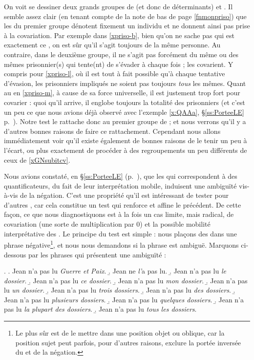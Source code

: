 On voit se dessiner deux grands groupes de {\GN} (et donc de déterminants) \Last[a--e] et \Last[g--l].  Il semble assez clair (en tenant compte de la note de bas de page \ref{fnmonpriso}) que les {\GN} du premier groupe dénotent fixement un individu %
et ne donnent ainsi pas prise à la covariation. Par exemple dans \ref{xpriso-b}, bien qu'on ne sache pas qui est exactement ce , on est sûr qu'il s'agit toujours de la même personne. Au contraire, dans le deuxième groupe, il ne s'agit pas forcément du même ou des mêmes prisonnier(s) qui tente(nt) de s'évader à chaque fois ; les {\GN} covarient. Y compris pour \ref{xpriso-l}, où il est tout à fait possible qu'à chaque tentative d'évasion, les prisonniers impliqués ne soient pas toujours \emph{tous} les mêmes.
Quant au {\GN}  en \ref{xpriso-m}, à cause de sa force universelle, il est justement trop fort pour covarier : quoi qu'il arrive, il englobe toujours la totalité des prisonniers
(et c'est un peu ce que nous avions déjà observé avec l'exemple \ref{x:QAAa}, \S\ref{ss:PorteeLE} p.~\pageref{x:QAAa}). Notre test le rattache donc au premier groupe de {\GN} ; et nous verrons qu'il y a d'autres bonnes raisons de faire ce rattachement. Cependant nous allons immédiatement voir qu'il existe également de bonnes raisons de le tenir un peu à l'écart, ou plus exactement de procéder à des regroupements un peu différents de ceux de \ref{xGNsubitcv}.

\largerpage

Nous avions constaté, en \S\ref{ss:PorteeLE} (p.~\pageref{x:neg+Q}), que les {\GN} qui correspondent à des quantificateurs, du fait de leur interprétation mobile, induisent une ambiguïté vis-à-vis de la négation. C'est une propriété qu'il est intéressant de tester pour d'autres {\GN}, car cela constitue un test qui renforce et affine le précédent. De cette façon, ce que nous diagnostiquons est à la fois un cas limite, mais radical, de covariation (une sorte de multiplication par 0) et la possible mobilité interprétative des {\GN}. Le principe du test est simple : nous plaçons des {\GN} dans une phrase négative\footnote{Le plus sûr est de le mettre dans une position objet ou oblique, car la position sujet peut parfois, pour d'autres raisons, exclure la portée inversée du {\GN} et de la négation.}, et nous nous demandons si la phrase est ambiguë. Marquons ci-dessous par {\mambig} les phrases qui présentent une ambiguïté :

\ex. \label{xGNambigNeg}
\a. Jean n'a pas lu \emph{Guerre et Paix}.
\b. Jean ne \emph{l'}a pas lu.
\b. Jean n'a pas lu \emph{le dossier}.
\b. Jean n'a pas lu \emph{ce dossier}.
\b. Jean n'a pas lu \emph{mon dossier}.
\b. \jambig Jean n'a pas lu \emph{un dossier}.
\b. \jambig Jean n'a pas lu \emph{trois dossiers}.
\b. \jambig Jean n'a pas lu \emph{des dossiers}.
\b. \jambig Jean n'a pas lu \emph{plusieurs dossiers}.
\b. \jambig Jean n'a pas lu \emph{quelques dossiers}.
\b. \jambig Jean n'a pas lu \emph{la plupart des dossiers}.
\b. \jambig Jean n'a pas lu \emph{tous les dossiers}.


